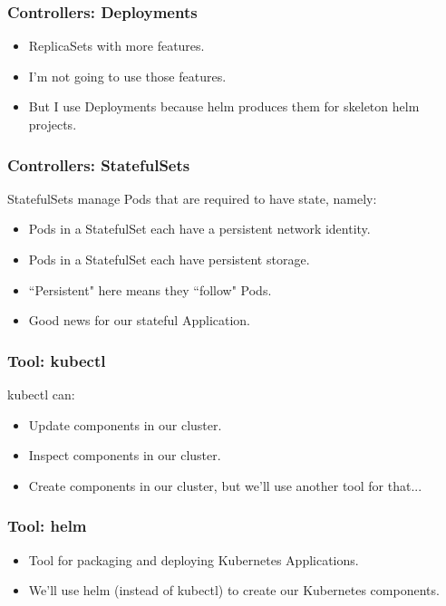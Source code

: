 \documentclass{beamer}
\begin{document}
\begin{frame}
    \frametitle{Controllers: Deployments}
    \begin{itemize}
        \item ReplicaSets with more features.\pause
        \item I'm not going to use those features.\pause
        \item But I use Deployments because helm produces them for skeleton helm projects.
    \end{itemize}
\end{frame}

\begin{frame}
    \frametitle{Controllers: StatefulSets}
    StatefulSets manage Pods that are required to have state, namely:\pause
    \begin{itemize}
        \item Pods in a StatefulSet each have a persistent network identity.\pause
        \item Pods in a StatefulSet each have persistent storage.\pause
        \item ``Persistent" here means they ``follow" Pods.\pause
        \item Good news for our stateful Application.
    \end{itemize}
\end{frame}

\begin{frame}
\frametitle{Tool: kubectl\footnotemark}
kubectl can:
\begin{itemize}
\item Update components in our cluster.\pause
\item Inspect components in our cluster.\pause
\item Create components in our cluster, but we'll use another tool for that...
\end{itemize}
\end{frame}

\begin{frame}
\frametitle{Tool: helm\footnotemark}
\begin{itemize}
    \item Tool for packaging and deploying Kubernetes Applications.
    \item We'll use helm (instead of kubectl) to create our Kubernetes components.
\end{itemize}
\end{frame}
\end{document}
